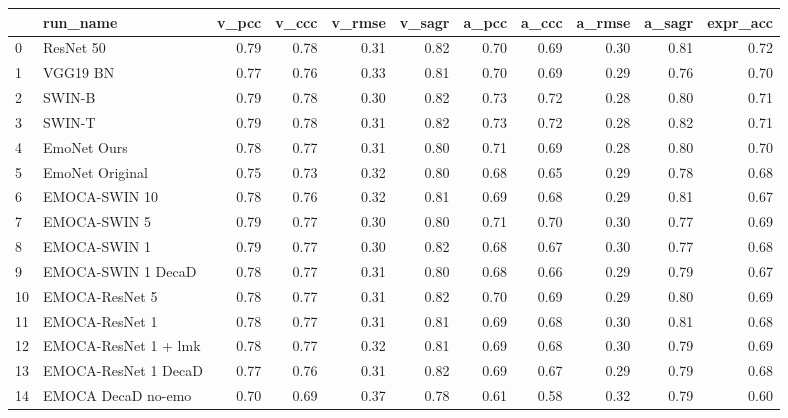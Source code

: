 \begin{tabular}{llrrrrrrrrr}
\toprule
{} &                   run\_name &  v\_pcc &  v\_ccc &  v\_rmse &  v\_sagr &  a\_pcc &  a\_ccc &  a\_rmse &  a\_sagr &  expr\_acc \\
\midrule
0  &                  ResNet 50 &   0.79 &   0.78 &    0.31 &    0.82 &   0.70 &   0.69 &    0.30 &    0.81 &      0.72 \\
1  &                   VGG19 BN &   0.77 &   0.76 &    0.33 &    0.81 &   0.70 &   0.69 &    0.29 &    0.76 &      0.70 \\
2  &                     SWIN-B &   0.79 &   0.78 &    0.30 &    0.82 &   0.73 &   0.72 &    0.28 &    0.80 &      0.71 \\
3  &                     SWIN-T &   0.79 &   0.78 &    0.31 &    0.82 &   0.73 &   0.72 &    0.28 &    0.82 &      0.71 \\
4  &                EmoNet Ours &   0.78 &   0.77 &    0.31 &    0.80 &   0.71 &   0.69 &    0.28 &    0.80 &      0.70 \\
5  &            EmoNet Original &   0.75 &   0.73 &    0.32 &    0.80 &   0.68 &   0.65 &    0.29 &    0.78 &      0.68 \\
6  &              EMOCA-SWIN 10 &   0.78 &   0.76 &    0.32 &    0.81 &   0.69 &   0.68 &    0.29 &    0.81 &      0.67 \\
7  &               EMOCA-SWIN 5 &   0.79 &   0.77 &    0.30 &    0.80 &   0.71 &   0.70 &    0.30 &    0.77 &      0.69 \\
8  &               EMOCA-SWIN 1 &   0.79 &   0.77 &    0.30 &    0.82 &   0.68 &   0.67 &    0.30 &    0.77 &      0.68 \\
9  &         EMOCA-SWIN 1 DecaD &   0.78 &   0.77 &    0.31 &    0.80 &   0.68 &   0.66 &    0.29 &    0.79 &      0.67 \\
10 &             EMOCA-ResNet 5 &   0.78 &   0.77 &    0.31 &    0.82 &   0.70 &   0.69 &    0.29 &    0.80 &      0.69 \\
11 &             EMOCA-ResNet 1 &   0.78 &   0.77 &    0.31 &    0.81 &   0.69 &   0.68 &    0.30 &    0.81 &      0.68 \\
12 &       EMOCA-ResNet 1 + lmk &   0.78 &   0.77 &    0.32 &    0.81 &   0.69 &   0.68 &    0.30 &    0.79 &      0.69 \\
13 &       EMOCA-ResNet 1 DecaD &   0.77 &   0.76 &    0.31 &    0.82 &   0.69 &   0.67 &    0.29 &    0.79 &      0.68 \\
14 &         EMOCA DecaD no-emo &   0.70 &   0.69 &    0.37 &    0.78 &   0.61 &   0.58 &    0.32 &    0.79 &      0.60 \\

\end{tabular}
